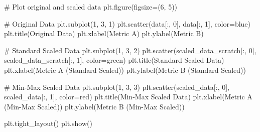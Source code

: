 \documentclass[
  letterpaper,
  DIV=11,
  numbers=noendperiod]{scrreprt}
\newenvironment{Shaded}{\begin{snugshade}}{\end{snugshade}}
\newcommand{\CommentTok}[1]{\textcolor[rgb]{0.37,0.37,0.37}{#1}}
\newcommand{\DecValTok}[1]{\textcolor[rgb]{0.68,0.00,0.00}{#1}}
\newcommand{\NormalTok}[1]{\textcolor[rgb]{0.00,0.23,0.31}{#1}}
\newcommand{\OperatorTok}[1]{\textcolor[rgb]{0.37,0.37,0.37}{#1}}
\newcommand{\StringTok}[1]{\textcolor[rgb]{0.13,0.47,0.30}{#1}}
\theoremstyle{plain}
\theoremstyle{definition}
\theoremstyle{remark}
\begin{document}
\begin{Shaded}
\begin{Highlighting}[]
\CommentTok{\# Plot original and scaled data}
\NormalTok{plt.figure(figsize}\OperatorTok{=}\NormalTok{(}\DecValTok{6}\NormalTok{, }\DecValTok{5}\NormalTok{))}

\CommentTok{\# Original Data}
\NormalTok{plt.subplot(}\DecValTok{1}\NormalTok{, }\DecValTok{3}\NormalTok{, }\DecValTok{1}\NormalTok{)}
\NormalTok{plt.scatter(data[:, }\DecValTok{0}\NormalTok{], data[:, }\DecValTok{1}\NormalTok{], color}\OperatorTok{=}\StringTok{\textquotesingle{}blue\textquotesingle{}}\NormalTok{)}
\NormalTok{plt.title(}\StringTok{\textquotesingle{}Original Data\textquotesingle{}}\NormalTok{)}
\NormalTok{plt.xlabel(}\StringTok{\textquotesingle{}Metric A\textquotesingle{}}\NormalTok{)}
\NormalTok{plt.ylabel(}\StringTok{\textquotesingle{}Metric B\textquotesingle{}}\NormalTok{)}

\CommentTok{\# Standard Scaled Data}
\NormalTok{plt.subplot(}\DecValTok{1}\NormalTok{, }\DecValTok{3}\NormalTok{, }\DecValTok{2}\NormalTok{)}
\NormalTok{plt.scatter(scaled\_data\_scratch[:, }\DecValTok{0}\NormalTok{], scaled\_data\_scratch[:, }\DecValTok{1}\NormalTok{], color}\OperatorTok{=}\StringTok{\textquotesingle{}green\textquotesingle{}}\NormalTok{)}
\NormalTok{plt.title(}\StringTok{\textquotesingle{}Standard Scaled Data\textquotesingle{}}\NormalTok{)}
\NormalTok{plt.xlabel(}\StringTok{\textquotesingle{}Metric A (Standard Scaled)\textquotesingle{}}\NormalTok{)}
\NormalTok{plt.ylabel(}\StringTok{\textquotesingle{}Metric B (Standard Scaled)\textquotesingle{}}\NormalTok{)}

\CommentTok{\# Min{-}Max Scaled Data}
\NormalTok{plt.subplot(}\DecValTok{1}\NormalTok{, }\DecValTok{3}\NormalTok{, }\DecValTok{3}\NormalTok{)}
\NormalTok{plt.scatter(scaled\_data[:, }\DecValTok{0}\NormalTok{], scaled\_data[:, }\DecValTok{1}\NormalTok{], color}\OperatorTok{=}\StringTok{\textquotesingle{}red\textquotesingle{}}\NormalTok{)}
\NormalTok{plt.title(}\StringTok{\textquotesingle{}Min{-}Max Scaled Data\textquotesingle{}}\NormalTok{)}
\NormalTok{plt.xlabel(}\StringTok{\textquotesingle{}Metric A (Min{-}Max Scaled)\textquotesingle{}}\NormalTok{)}
\NormalTok{plt.ylabel(}\StringTok{\textquotesingle{}Metric B (Min{-}Max Scaled)\textquotesingle{}}\NormalTok{)}

\NormalTok{plt.tight\_layout()}
\NormalTok{plt.show()}
\end{Highlighting}
\end{Shaded}
\end{document}
